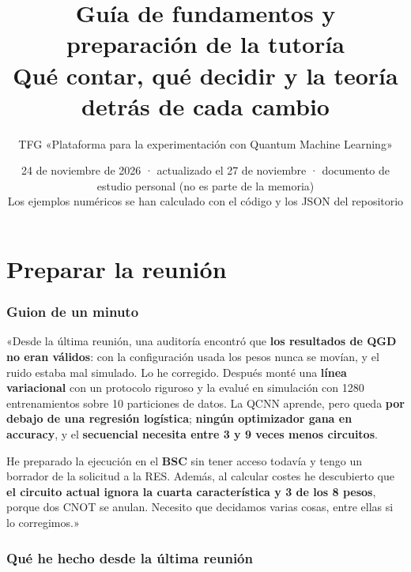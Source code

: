 \documentclass[11pt,a4paper]{article}
\title{\textbf{Guía de fundamentos y preparación de la tutoría}\\[2pt]
\large Qué contar, qué decidir y la teoría detrás de cada cambio}
\author{TFG «Plataforma para la experimentación con Quantum Machine Learning»}
\date{24 de noviembre de 2026 · actualizado el 27 de noviembre · documento de estudio personal (no es parte de la memoria)\\
\small Los ejemplos numéricos se han calculado con el código y los JSON del repositorio}
\begin{document}
\maketitle
\thispagestyle{fancy}
\tableofcontents

\part{Preparar la reunión}

\section{Guion de un minuto}

\begin{keybox}
«Desde la última reunión, una auditoría encontró que \textbf{los resultados de QGD no eran válidos}: con la
configuración usada los pesos nunca se movían, y el ruido estaba mal simulado. Lo he corregido. Después monté una
\textbf{línea variacional} con un protocolo riguroso y la evalué en simulación con 1280 entrenamientos sobre 10
particiones de datos. La QCNN aprende, pero queda \textbf{por debajo de una regresión logística}; \textbf{ningún
optimizador gana en accuracy}, y el \textbf{secuencial necesita entre 3 y 9 veces menos circuitos}.

He preparado la ejecución en el \textbf{BSC} sin tener acceso todavía y tengo un borrador de la solicitud a la RES.
Además, al calcular costes he descubierto que \textbf{el circuito actual ignora la cuarta característica y 3 de los 8
pesos}, porque dos CNOT se anulan. Necesito que decidamos varias cosas, entre ellas si lo corregimos.»
\end{keybox}

\section{Qué he hecho desde la última reunión}
\end{document}
